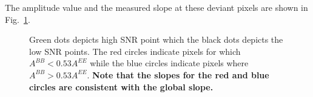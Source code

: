 \documentclass[12pt]{article}
\begin{document}
The amplitude value and the measured slope at these deviant pixels are shown in Fig.~\ref{fig:amp_sl_scatter}.
\begin{figure}[!h]
\centering
{}
\caption{Green dots depicts high SNR point which the black dots depicts the low SNR points. The red circles indicate pixels for which $A^{BB} < 0.53A^{EE}$ while the blue circles indicate pixels where $A^{BB} > 0.53A^{EE}$. {\bf Note that the slopes for the red and blue circles are consistent with the global slope.}}
\label{fig:amp_sl_scatter}
\end{figure}
\end{document}
